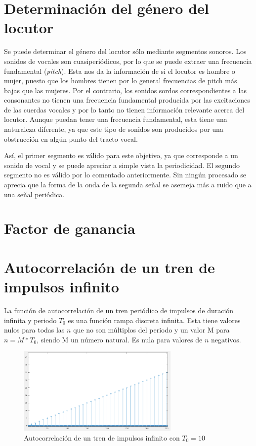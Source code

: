 \documentclass[12pt]{article}
\begin{document}
\pagebreak


\section{Determinación del género del locutor}
Se puede determinar el género del locutor sólo mediante segmentos sonoros. Los sonidos de vocales son cuasiperiódicos, por lo que se puede extraer una frecuencia fundamental (\textit{pitch}). Esta nos da la información de si el locutor es hombre o mujer, puesto que los hombres tienen por lo general frecuencias de pitch más bajas que las mujeres. Por el contrario, los sonidos sordos correspondientes a las consonantes no tienen una frecuencia fundamental producida por las excitaciones de las cuerdas vocales y por lo tanto no tienen información relevante acerca del locutor. Aunque puedan tener una frecuencia fundamental, esta tiene una naturaleza diferente, ya que este tipo de sonidos son producidos por una obstrucción en algún punto del tracto vocal.

Así, el primer segmento es válido para este objetivo, ya que corresponde a un sonido de vocal y se puede apreciar a simple vista la periodicidad. El segundo segmento no es válido por lo comentado anteriormente. Sin ningún procesado se aprecia que la forma de la onda de la segunda señal se asemeja más a ruido que a una señal periódica.

\section{Factor de ganancia}

\section{Autocorrelación de un tren de impulsos infinito}
La función de autocorrelación de un tren periódico de impulsos de duración infinita y periodo $T_0$ es una función rampa discreta infinita. Esta tiene valores nulos para todas las $n$ que no son múltiplos del periodo y un valor M para $n = M*T_0$, siendo M un número natural. Es nula para valores de $n$ negativos.

\begin{figure}[H]
	\centering
	\includegraphics[width=0.7\textwidth]{autocorr_tren_infinito.png}
	\caption{Autocorrelación de un tren de impulsos infinito con $T_0 = 10$}
\end{figure}
\end{document}

